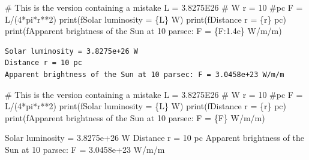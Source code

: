 \documentclass[
  letterpaper,
  DIV=11,
  numbers=noendperiod]{scrartcl}
\newenvironment{Shaded}{\begin{snugshade}}{\end{snugshade}}
\newcommand{\BuiltInTok}[1]{\textcolor[rgb]{0.00,0.23,0.31}{#1}}
\newcommand{\CommentTok}[1]{\textcolor[rgb]{0.37,0.37,0.37}{#1}}
\newcommand{\DecValTok}[1]{\textcolor[rgb]{0.68,0.00,0.00}{#1}}
\newcommand{\FloatTok}[1]{\textcolor[rgb]{0.68,0.00,0.00}{#1}}
\newcommand{\NormalTok}[1]{\textcolor[rgb]{0.00,0.23,0.31}{#1}}
\newcommand{\OperatorTok}[1]{\textcolor[rgb]{0.37,0.37,0.37}{#1}}
\newcommand{\SpecialCharTok}[1]{\textcolor[rgb]{0.37,0.37,0.37}{#1}}
\newcommand{\SpecialStringTok}[1]{\textcolor[rgb]{0.13,0.47,0.30}{#1}}
\begin{document}
\begin{Shaded}
\begin{Highlighting}[]
\CommentTok{\# This is the version containing a mistake}
\NormalTok{L }\OperatorTok{=} \FloatTok{3.8275E26} \CommentTok{\# W}
\NormalTok{r }\OperatorTok{=} \DecValTok{10} \CommentTok{\#pc}
\NormalTok{F }\OperatorTok{=}\NormalTok{ L}\OperatorTok{/}\NormalTok{(}\DecValTok{4}\OperatorTok{*}\NormalTok{pi}\OperatorTok{*}\NormalTok{r}\OperatorTok{**}\DecValTok{2}\NormalTok{)}
\BuiltInTok{print}\NormalTok{(}\SpecialStringTok{f\textquotesingle{}Solar luminosity = }\SpecialCharTok{\{}\NormalTok{L}\SpecialCharTok{\}}\SpecialStringTok{ W\textquotesingle{}}\NormalTok{)}
\BuiltInTok{print}\NormalTok{(}\SpecialStringTok{f\textquotesingle{}Distance r = }\SpecialCharTok{\{}\NormalTok{r}\SpecialCharTok{\}}\SpecialStringTok{ pc\textquotesingle{}}\NormalTok{)}
\BuiltInTok{print}\NormalTok{(}\SpecialStringTok{f\textquotesingle{}Apparent brightness of the Sun at 10 parsec: F = }\SpecialCharTok{\{}\NormalTok{F}\SpecialCharTok{:1.4e\}}\SpecialStringTok{ W/m/m\textquotesingle{}}\NormalTok{)}
\end{Highlighting}
\end{Shaded}

\begin{verbatim}
Solar luminosity = 3.8275e+26 W
Distance r = 10 pc
Apparent brightness of the Sun at 10 parsec: F = 3.0458e+23 W/m/m
\end{verbatim}

\begin{Shaded}
\begin{Highlighting}[]
\CommentTok{\# This is the version containing a mistake}
\NormalTok{L }\OperatorTok{=} \FloatTok{3.8275E26} \CommentTok{\# W}
\NormalTok{r }\OperatorTok{=} \DecValTok{10} \CommentTok{\#pc}
\NormalTok{F }\OperatorTok{=}\NormalTok{ L}\OperatorTok{/}\NormalTok{(}\DecValTok{4}\OperatorTok{*}\NormalTok{pi}\OperatorTok{*}\NormalTok{r}\OperatorTok{**}\DecValTok{2}\NormalTok{)}
\BuiltInTok{print}\NormalTok{(}\SpecialStringTok{f\textquotesingle{}Solar luminosity = }\SpecialCharTok{\{}\NormalTok{L}\SpecialCharTok{\}}\SpecialStringTok{ W\textquotesingle{}}\NormalTok{)}
\BuiltInTok{print}\NormalTok{(}\SpecialStringTok{f\textquotesingle{}Distance r = }\SpecialCharTok{\{}\NormalTok{r}\SpecialCharTok{\}}\SpecialStringTok{ pc\textquotesingle{}}\NormalTok{)}
\BuiltInTok{print}\NormalTok{(}\SpecialStringTok{f\textquotesingle{}Apparent brightness of the Sun at 10 parsec: F = }\SpecialCharTok{\{}\NormalTok{F}\SpecialCharTok{\}}\SpecialStringTok{ W/m/m\textquotesingle{}}\NormalTok{)}

\NormalTok{Solar luminosity }\OperatorTok{=} \FloatTok{3.8275e+26}\NormalTok{ W}
\NormalTok{Distance r }\OperatorTok{=} \DecValTok{10}\NormalTok{ pc}
\NormalTok{Apparent brightness of the Sun at }\DecValTok{10}\NormalTok{ parsec: F }\OperatorTok{=} \FloatTok{3.0458e+23}\NormalTok{ W}\OperatorTok{/}\NormalTok{m}\OperatorTok{/}\NormalTok{m}
\end{Highlighting}
\end{Shaded}
\end{document}
